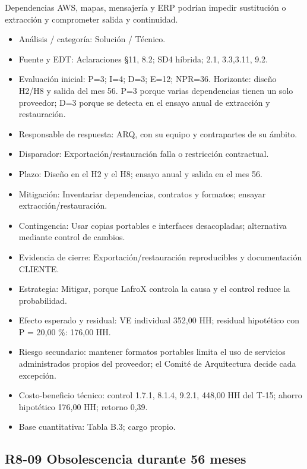 Dependencias AWS, mapas, mensajería y ERP podrían impedir sustitución o extracción y comprometer salida y continuidad.

\begin{itemize}[leftmargin=*,itemsep=3pt]
\item Análisis / categoría: Solución / Técnico.
\item Fuente y EDT: Aclaraciones §11, 8.2; SD4 híbrida; 2.1, 3.3,3.11, 9.2.
\item Evaluación inicial: P=3; I=4; D=3; E=12; NPR=36. Horizonte: diseño H2/H8 y salida del mes 56. P=3 porque varias dependencias tienen un solo proveedor; D=3 porque se detecta en el ensayo anual de extracción y restauración.
\item Responsable de respuesta: ARQ, con su equipo y contrapartes de su ámbito.
\item Disparador: Exportación/restauración falla o restricción contractual.
\item Plazo: Diseño en el H2 y el H8; ensayo anual y salida en el mes 56.
\item Mitigación: Inventariar dependencias, contratos y formatos; ensayar extracción/restauración.
\item Contingencia: Usar copias portables e interfaces desacopladas; alternativa mediante control de cambios.
\item Evidencia de cierre: Exportación/restauración reproducibles y documentación CLIENTE.
\item Estrategia: Mitigar, porque LafroX controla la causa y el control reduce la probabilidad.
\item Efecto esperado y residual: VE individual 352,00 HH; residual hipotético con P = 20,00 \%: 176,00 HH.
\item Riesgo secundario: mantener formatos portables limita el uso de servicios administrados propios del proveedor; el Comité de Arquitectura decide cada excepción.
\item Costo-beneficio técnico: control 1.7.1, 8.1.4, 9.2.1, 448,00 HH del T-15; ahorro hipotético 176,00 HH; retorno 0,39.
\item Base cuantitativa: Tabla B.3; cargo propio.
\end{itemize}

\subsection*{R8-09 \textemdash{} Obsolescencia durante 56 meses}

